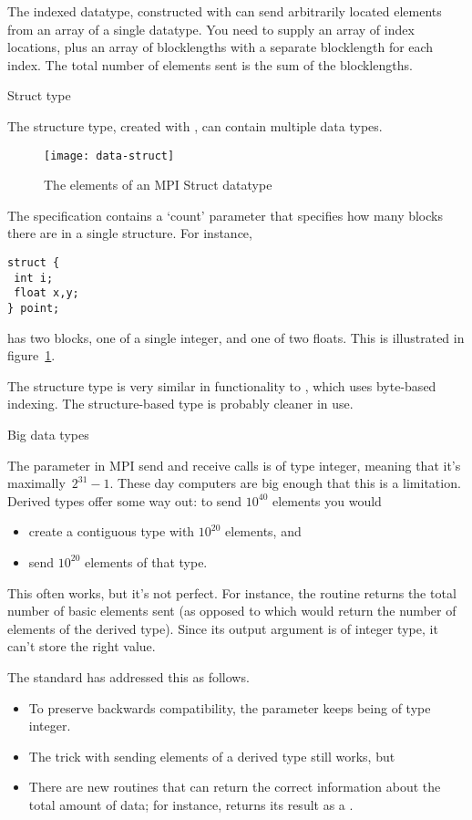 The indexed datatype, constructed with 
can send arbitrarily located elements from an array of a single datatype.
You need to supply an array of index locations, plus an array of blocklengths
with a separate blocklength for each index. The total number of elements sent
is the sum of the blocklengths.

 {Struct type}

The structure type, created with ,
can contain multiple data types.
\begin{figure}[ht]
  \texttt{[image: data-struct]}
  \caption{The elements of an MPI Struct datatype}
  \label{fig:data-struct}
\end{figure}
The specification contains a `count' parameter that specifies how many blocks
there are in a single structure. For instance,
\begin{verbatim}
struct {
 int i;
 float x,y;
} point;
\end{verbatim}
has two blocks, one of a single integer, and one of two floats.
This is illustrated in figure~\ref{fig:data-struct}.

The structure type is very similar in functionality to ,
which uses byte-based indexing. The structure-based type is probably cleaner
in use.


 {Big data types}

The  parameter in MPI send and receive calls is of type integer,
meaning that it's maximally~$2^{31}-1$. These day computers are big enough
that this is a limitation. Derived types offer some way out: to send $10^{40}$
elements you would
\begin{itemize}
\item create a contiguous type with $10^{20}$ elements, and
\item send $10^{20}$ elements of that type.
\end{itemize}
This often works, but it's not perfect. For instance, the routine
 returns the total number of basic elements sent
(as opposed to  which would return the number
of elements of the derived type). Since its output argument is
of integer type, it can't store the right value.

The  standard has addressed this
as follows.
\begin{itemize}
\item To preserve backwards compatibility, the  parameter keeps
  being of type integer.
\item The trick with sending elements of a derived type still works, but
\item There are new routines that can return the correct information about the
  total amount of data; for instance, 
  returns its result as a .
\end{itemize}

